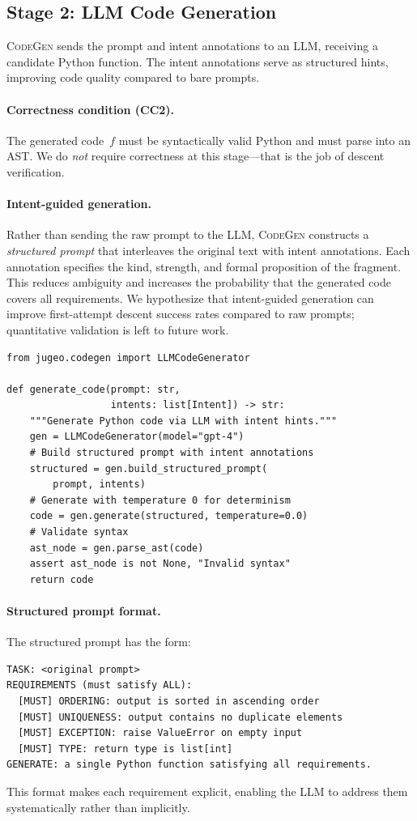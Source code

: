 \documentclass[11pt]{article}
\newcommand{\CodeGen}{\textsc{CodeGen}}
\begin{document}
\subsection{Stage 2: LLM Code Generation}\label{sec:stage2}

\CodeGen{} sends the prompt and intent annotations to an LLM,
receiving a candidate Python function.  The intent annotations serve as
structured hints, improving code quality compared to bare prompts.

\paragraph{Correctness condition (CC2).}
The generated code~$f$ must be syntactically valid Python and must
parse into an AST.  We do \emph{not} require correctness at this
stage---that is the job of descent verification.

\paragraph{Intent-guided generation.}
Rather than sending the raw prompt to the LLM, \CodeGen{} constructs
a \emph{structured prompt} that interleaves the original text with
intent annotations.  Each annotation specifies the kind, strength,
and formal proposition of the fragment.  This reduces ambiguity and
increases the probability that the generated code covers all
requirements.  We hypothesize that intent-guided generation can
improve first-attempt descent success rates compared to raw prompts;
quantitative validation is left to future work.

\begin{lstlisting}[caption={Code generation with intent hints.},label={lst:codegen}]
from jugeo.codegen import LLMCodeGenerator

def generate_code(prompt: str,
                  intents: list[Intent]) -> str:
    """Generate Python code via LLM with intent hints."""
    gen = LLMCodeGenerator(model="gpt-4")
    # Build structured prompt with intent annotations
    structured = gen.build_structured_prompt(
        prompt, intents)
    # Generate with temperature 0 for determinism
    code = gen.generate(structured, temperature=0.0)
    # Validate syntax
    ast_node = gen.parse_ast(code)
    assert ast_node is not None, "Invalid syntax"
    return code
\end{lstlisting}

\paragraph{Structured prompt format.}
The structured prompt has the form:
\begin{lstlisting}[style=jugeo-output]
TASK: <original prompt>
REQUIREMENTS (must satisfy ALL):
  [MUST] ORDERING: output is sorted in ascending order
  [MUST] UNIQUENESS: output contains no duplicate elements
  [MUST] EXCEPTION: raise ValueError on empty input
  [MUST] TYPE: return type is list[int]
GENERATE: a single Python function satisfying all requirements.
\end{lstlisting}
This format makes each requirement explicit, enabling the LLM to
address them systematically rather than implicitly.
\end{document}
